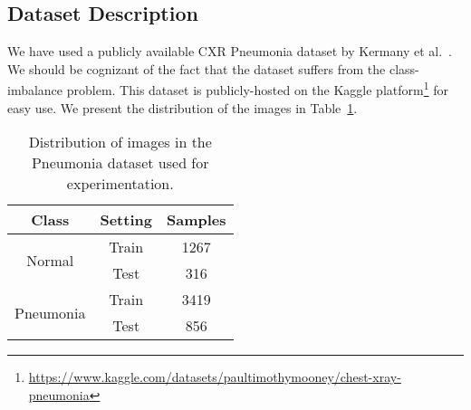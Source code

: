 \documentclass[final,3p,times]{elsarticle}
\begin{document}
\subsection{Dataset Description}
We have used a publicly available CXR Pneumonia dataset by Kermany et al.~\cite{kermany2018identifying}. We should be cognizant of the fact that the dataset suffers from the class-imbalance problem. This dataset is publicly-hosted on the Kaggle platform\footnote{\href{https://www.kaggle.com/datasets/paultimothymooney/chest-xray-pneumonia}{https://www.kaggle.com/datasets/paultimothymooney/chest-xray-pneumonia}} for easy use. We present the distribution of the images in Table~\ref{tab:data}. \begin{table}[ht!]
    \centering
        \caption{Distribution of images in the Pneumonia dataset used for experimentation.}
    \begin{tabular}{c|c|c}
        \toprule
        Class & Setting & Samples \\
        \midrule
        \multirow{2}{*}{Normal} & Train & 1267\\
        & Test & 316\\
        \midrule
       \multirow{2}{*}{Pneumonia} & Train & 3419\\
        & Test & 856\\
        \bottomrule
    \end{tabular}
    \label{tab:data}
\end{table}
\end{document}
